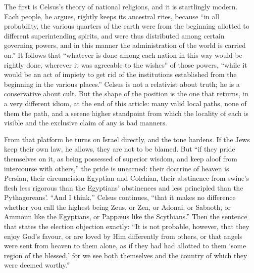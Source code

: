 The first is Celsus's theory of national religions, and it is startlingly modern. Each people, he argues, rightly keeps its ancestral rites, because ``in all probability, the various quarters of the earth were from the beginning allotted to different superintending spirits, and were thus distributed among certain governing powers, and in this manner the administration of the world is carried on.'' It follows that ``whatever is done among each nation in this way would be rightly done, wherever it was agreeable to the wishes'' of those powers, ``while it would be an act of impiety to get rid of the institutions established from the beginning in the various places.'' Celsus is not a relativist about truth; he is a conservative about cult. But the shape of the position is the one that returns, in a very different idiom, at the end of this article: many valid local paths, none of them the path, and a serene higher standpoint from which the locality of each is visible and the exclusive claim of any is bad manners.

From that platform he turns on Israel directly, and the tone hardens. If the Jews keep their own law, he allows, they are not to be blamed. But ``if they pride themselves on it, as being possessed of superior wisdom, and keep aloof from intercourse with others,'' the pride is unearned: their doctrine of heaven is Persian, their circumcision Egyptian and Colchian, their abstinence from swine's flesh less rigorous than the Egyptians' abstinences and less principled than the Pythagoreans'. ``And I think,'' Celsus continues, ``that it makes no difference whether you call the highest being Zeus, or Zen, or Adonai, or Sabaoth, or Ammoun like the Egyptians, or Papp\ae us like the Scythians.'' Then the sentence that states the election objection exactly: ``It is not probable, however, that they enjoy God's favour, or are loved by Him differently from others, or that angels were sent from heaven to them alone, as if they had had allotted to them `some region of the blessed,' for we see both themselves and the country of which they were deemed worthy.''


